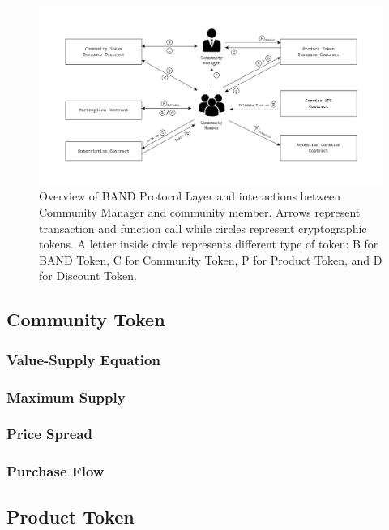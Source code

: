 \documentclass[letterpaper,11pt]{article}
\begin{document}
\bigbreak
\begin{figure}[h]
    \centering
    \includegraphics[width=1\textwidth]{figures/protocol}
    \caption{Overview of BAND Protocol Layer and interactions between Community Manager and community member. Arrows represent transaction and function call while circles represent cryptographic tokens. A letter inside circle represents different type of token: B for BAND Token, C for Community Token, P for Product Token, and D for Discount Token.}
    \label{fig:bandlayer}
\end{figure}

\subsection{Community Token}

\subsubsection{Value-Supply Equation}

\subsubsection{Maximum Supply}

\subsubsection{Price Spread}

\subsubsection{Purchase Flow}

\subsection{Product Token}
\end{document}
